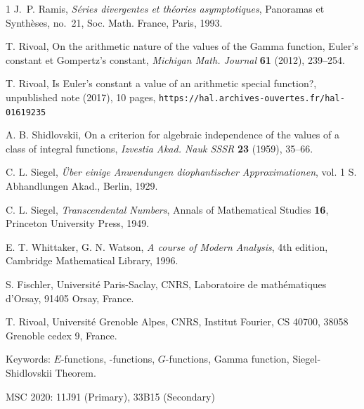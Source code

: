 \documentclass[reqno,12pt]{article}
\numberwithin{equation}{section}
\theoremstyle{remark}
\newcommand{\tantie}{\foreignlanguage{russian}{\CYREREV}}
\newcommand{\antie}{\text{\tantie}}
\begin{document}
\begin{thebibliography}{1}
 J.~P. Ramis, {\em S\'eries divergentes et th\'eories
  asymptotiques}, Panoramas et Synth\`eses, no.~21, Soc. Math. France, Paris,
  1993.

 T. Rivoal, { On the arithmetic nature of the values of the Gamma function, Euler's constant et Gompertz's constant}, {\em  Michigan Math. Journal} {\bf 61} (2012),  239--254.

 T. Rivoal,  Is Euler's constant a value of an arithmetic special function?, unpublished note (2017), 10 pages, {\tt https://hal.archives-ouvertes.fr/hal-01619235}

 A. B. Shidlovskii, {On a criterion for algebraic independence of the values of a class of integral functions}, {\em Izvestia Akad. Nauk SSSR} {\bf 23} (1959), 35--66.


 C. L. Siegel, {\em \"Uber einige Anwendungen diophantischer Approximationen}, vol. 1 S. Abhand\-lungen Akad., Berlin, 1929.

 C. L. Siegel, {\em Transcendental Numbers}, Annals of Mathematical Studies {\bf 16}, Princeton University Press, 1949.

 E. T. Whittaker, G. N. Watson, {\em A course of Modern Analysis}, 4th edition, Cambridge Mathematical Library, 1996.

\end{thebibliography}

\medskip

\noindent S. Fischler,  Universit\'e Paris-Saclay,  CNRS, Laboratoire de math\'ematiques d'Orsay,  91405 Orsay, France.

\medskip

\noindent T. Rivoal, Universit\'e Grenoble Alpes, CNRS, Institut Fourier, CS 40700, 38058 Grenoble cedex 9, France.

\bigskip


\noindent Keywords: $E$-functions, \antie-functions, $G$-functions, Gamma function, Siegel-Shidlovskii Theorem.
\medskip

\noindent MSC 2020: 11J91 (Primary), 33B15 (Secondary)
\end{document}
